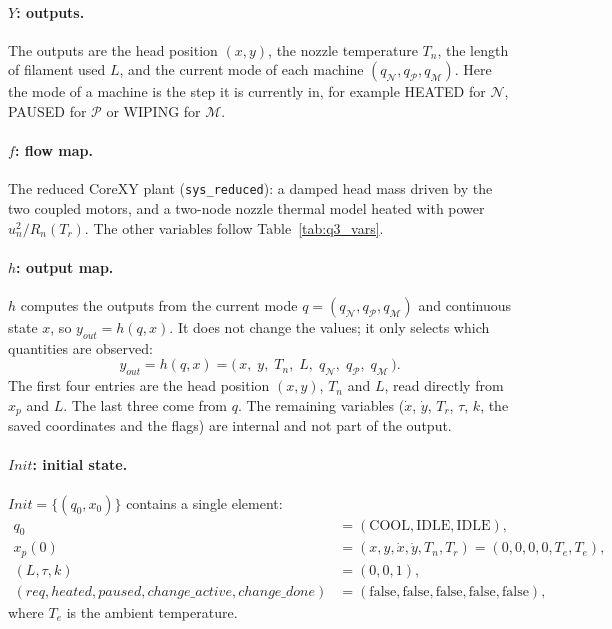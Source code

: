 \paragraph{\texorpdfstring{$Y$}{Y}: outputs.} The outputs are the head position $(x, y)$, the nozzle temperature $T_n$, the length of filament used $L$, and the current mode of each machine $(q_{\mathcal{N}}, q_{\mathcal{P}}, q_{\mathcal{M}})$. Here the mode of a machine is the step it is currently in, for example HEATED for $\mathcal{N}$, PAUSED for $\mathcal{P}$ or WIPING for $\mathcal{M}$.

\paragraph{\texorpdfstring{$f$}{f}: flow map.} The reduced CoreXY plant (\texttt{sys\_reduced}): a damped head mass driven by the two coupled motors, and a two-node nozzle thermal model heated with power $u_n^2 / R_n(T_r)$. The other variables follow Table~\ref{tab:q3_vars}.

\paragraph{\texorpdfstring{$h$}{h}: output map.} $h$ computes the outputs from the current mode $q = (q_{\mathcal{N}}, q_{\mathcal{P}}, q_{\mathcal{M}})$ and continuous state $x$, so $y_{out} = h(q, x)$. It does not change the values; it only selects which quantities are observed:
\[
    y_{out} = h(q, x) = \bigl(\, x,\; y,\; T_n,\; L,\; q_{\mathcal{N}},\; q_{\mathcal{P}},\; q_{\mathcal{M}} \,\bigr).
\]
The first four entries are the head position $(x, y)$, $T_n$ and $L$, read directly from $x_p$ and $L$. The last three come from $q$. The remaining variables ($\dot{x}$, $\dot{y}$, $T_r$, $\tau$, $k$, the saved coordinates and the flags) are internal and not part of the output.

\paragraph{\texorpdfstring{$\mathit{Init}$}{Init}: initial state.} $\mathit{Init} = \{(q_0, x_0)\}$ contains a single element:
\begin{align*}
    q_0 &= (\text{COOL}, \text{IDLE}, \text{IDLE}), \\
    x_p(0) &= (x, y, \dot{x}, \dot{y}, T_n, T_r) = (0, 0, 0, 0, T_e, T_e), \\
    (L, \tau, k) &= (0, 0, 1), \\
    (\mathit{req}, \mathit{heated}, \mathit{paused}, \mathit{change\_active}, \mathit{change\_done}) &= (\text{false}, \text{false}, \text{false}, \text{false}, \text{false}),
\end{align*}
where $T_e$ is the ambient temperature.

